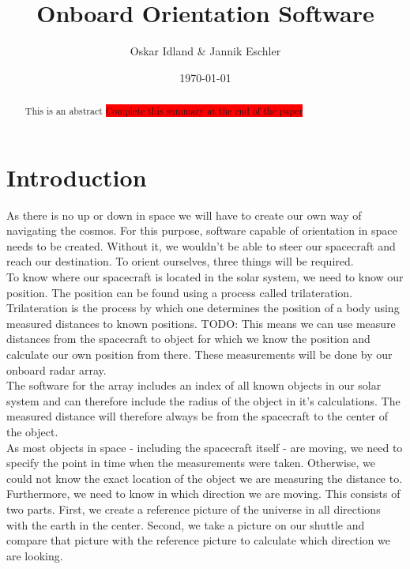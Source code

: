 \documentclass[reprint,english,notitlepage]{revtex4-2}
\begin{document}
\title{Onboard Orientation Software}
\author{Oskar Idland \& Jannik Eschler}
\date{\today}

\begin{abstract}
    This is an abstract \colorbox{red}{Complete this summary at the end of the paper}
\end{abstract}
\maketitle

\section{Introduction} \label{sec:introduction}
As there is no up or down in space we will have to create our own way of navigating the cosmos.
For this purpose, software capable of orientation in space needs to be created.
Without it, we wouldn't be able to steer our spacecraft and reach our destination.
To orient ourselves, three things will be required.\\
To know where our spacecraft is located in the solar system, we need to know our position.
The position can be found using a process called trilateration.\\
Trilateration is the process by which one determines the position of a body using measured distances to known positions.%
TODO: %
This means we can use measure distances from the spacecraft to object for which we know the position and calculate our own position from there.
These measurements will be done by our onboard radar array.\\
The software for the array includes an index of all known objects in our solar system and can therefore include the radius of the object in it's calculations.
The measured distance will therefore always be from the spacecraft to the center of the object.\\
As most objects in space - including the spacecraft itself - are moving, we need to specify the point in time when the measurements were taken.
Otherwise, we could not know the exact location of the object we are measuring the distance to.\\
Furthermore, we need to know in which direction we are moving.
This consists of two parts. First, we create a reference picture of the universe in all directions with the earth in the center. Second, we take a picture on our shuttle and compare that picture with the reference picture to calculate which direction we are looking.\\
\end{document}
